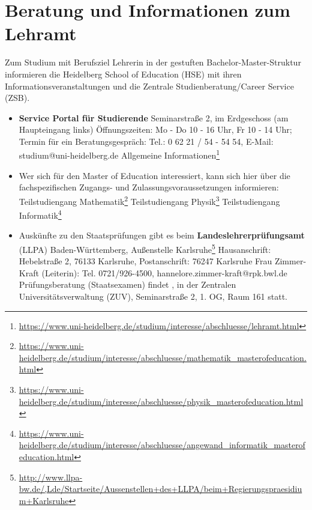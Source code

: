 \section{Beratung und Informationen zum Lehramt}
\label{lehramtkontakte}

Zum Studium mit Berufsziel Lehrerin in der gestuften Bachelor-Master-Struktur informieren die Heidelberg School of Education (HSE) mit ihren Informationsveranstaltungen und die Zentrale Studienberatung/Career Service (ZSB).
\begin{itemize}
\item \textbf{Service Portal für Studierende} \newline
    Seminarstraße 2, im Erdgeschoss (am Haupteingang links)
    Öffnungszeiten: Mo - Do 10 - 16 Uhr, Fr 10 - 14 Uhr; \newline
    Termin für ein Beratungsgespräch: Tel.: 0 62 21 / 54 - 54 54, E-Mail: studium@uni-heidelberg.de \newline
    Allgemeine Informationen\footnote{\url{https://www.uni-heidelberg.de/studium/interesse/abschluesse/lehramt.html}}

\item Wer sich für den Master of Education interessiert, kann sich hier über die fachspezifischen Zugangs- und Zulassungsvoraussetzungen informieren: \newline
    Teilstudiengang Mathematik\footnote{\url{https://www.uni-heidelberg.de/studium/interesse/abschluesse/mathematik_masterofeducation.html}} \newline
    Teilstudiengang Physik\footnote{\url{https://www.uni-heidelberg.de/studium/interesse/abschluesse/physik_masterofeducation.html}} \newline
    Teilstudiengang Informatik\footnote{\url{https://www.uni-heidelberg.de/studium/interesse/abschluesse/angewand_informatik_masterofeducation.html}}

\item Auskünfte zu den Staatsprüfungen gibt es beim \textbf{Landeslehrerprüfungsamt} (LLPA) Baden-Württemberg, Außenstelle Karlsruhe\footnote{\url{http://www.llpa-bw.de/,Lde/Startseite/Aussenstellen+des+LLPA/beim+Regierungspraesidium+Karlsruhe}} \newline
    Hausanschrift: Hebelstraße 2, 76133 Karlsruhe, Postanschrift: 76247 Karlsruhe \newline
    Frau Zimmer-Kraft (Leiterin): Tel. 0721/926-4500, hannelore.zimmer-kraft@rpk.bwl.de \newline
    Prüfungsberatung (Staatsexamen) findet \beratungpaedagogik, in der Zentralen Universitätsverwaltung (ZUV), Seminarstraße 2, 1. OG, Raum 161 statt.


\end{itemize}

